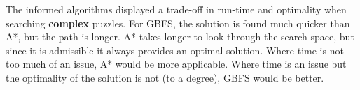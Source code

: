\documentclass[12pt]{article}
\begin{document}
The informed algorithms displayed a trade-off in run-time and optimality when searching \textbf{complex} puzzles. For GBFS, the solution is found much quicker than A*, but the path is longer. A* takes longer to look through the search space, but since it is admissible it always provides an optimal solution. Where time is not too much of an issue, A* would be more applicable. Where time is an issue but the optimality of the solution is not (to a degree), GBFS would be better.

\newpage


\end{document}
